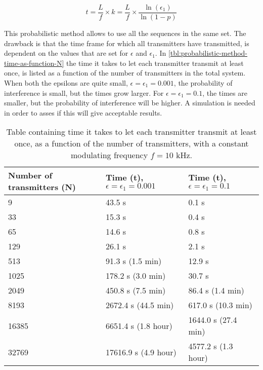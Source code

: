 \begin{equation}
	\label{eq:time-for-probabilistic-txs}
	t = \frac{L}{f} \times k = \frac{L}{f} \times \frac{\ln(\epsilon_1)}{\ln(1 - p)}
\end{equation}

This probabilistic method allows to use all the sequences in the same set.
The drawback is that the time frame for which all transmitters have transmitted, is dependent on the values that are set for $\epsilon$ and $\epsilon_1$.
In \autoref{tbl:probabilistic-method-time-as-function-N} the time it takes to let each transmitter transmit at least once, is listed as a function of the number of transmitters in the total system. 
When both the epsilons are quite small, $\epsilon = \epsilon_1 = 0.001$, the probability of interference is small, but the times grow larger.
For $\epsilon = \epsilon_1 = 0.1$, the times are smaller, but the probability of interference will be higher.
A simulation is needed in order to asses if this will give acceptable results.



\begin{table}[t]
	\centering
	\begin{tabular}{  | l | l | l | }

		\hline
		Number of transmitters (N)	& Time (t), $\epsilon = \epsilon_1 = 0.001$	& Time (t), $\epsilon = \epsilon_1 = 0.1$		\\ \hline

		9							& 43.5 s									& 0.1 s 										\\ \hline
		33							& 15.3 s									& 0.4 s											\\ \hline
		65							& 14.6 s									& 0.8 s											\\ \hline
		129							& 26.1 s									& 2.1 s											\\ \hline
		513							& 91.3 s (1.5 min)							& 12.9 s										\\ \hline
		1025						& 178.2 s	(3.0 min)						& 30.7 s										\\ \hline
		2049						& 450.8 s	(7.5 min)						& 86.4 s (1.4 min)								\\ \hline
		8193						& 2672.4 s (44.5 min)						& 617.0 s (10.3 min)							\\ \hline
		16385						& 6651.4 s (1.8 hour)						& 1644.0 s (27.4 min)							\\ \hline
		32769						& 17616.9 s (4.9 hour)						& 4577.2 s (1.3 hour)							\\ \hline


	\end{tabular}
	\caption{Table containing time it takes to let each transmitter transmit at least once, as a function of the number of transmitters, with a constant modulating frequency $f = 10$ kHz. }
	\label{tbl:probabilistic-method-time-as-function-N}

\end{table}


